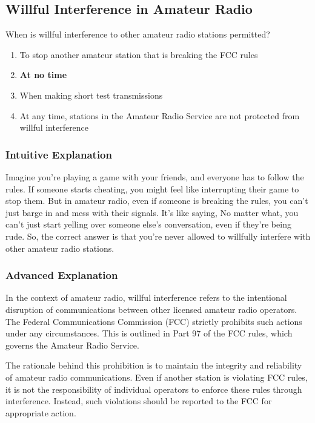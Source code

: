 \subsection{Willful Interference in Amateur Radio}
\label{T1A11}

\begin{tcolorbox}[colback=gray!10!white,colframe=black!75!black,title=T1A11]
When is willful interference to other amateur radio stations permitted?
\begin{enumerate}[label=\Alph*)]
    \item To stop another amateur station that is breaking the FCC rules
    \item \textbf{At no time}
    \item When making short test transmissions
    \item At any time, stations in the Amateur Radio Service are not protected from willful interference
\end{enumerate}
\end{tcolorbox}

\subsubsection{Intuitive Explanation}
Imagine you're playing a game with your friends, and everyone has to follow the rules. If someone starts cheating, you might feel like interrupting their game to stop them. But in amateur radio, even if someone is breaking the rules, you can't just barge in and mess with their signals. It's like saying, No matter what, you can't just start yelling over someone else's conversation, even if they're being rude. So, the correct answer is that you're never allowed to willfully interfere with other amateur radio stations.

\subsubsection{Advanced Explanation}
In the context of amateur radio, willful interference refers to the intentional disruption of communications between other licensed amateur radio operators. The Federal Communications Commission (FCC) strictly prohibits such actions under any circumstances. This is outlined in Part 97 of the FCC rules, which governs the Amateur Radio Service. 

The rationale behind this prohibition is to maintain the integrity and reliability of amateur radio communications. Even if another station is violating FCC rules, it is not the responsibility of individual operators to enforce these rules through interference. Instead, such violations should be reported to the FCC for appropriate action.

